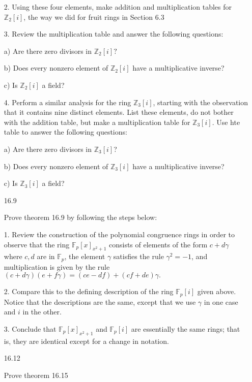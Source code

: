 \documentclass[12pt]{article}
\begin{document}
\begin{itemize}
2. Using these four elements, make addition and multiplication tables for $\mathbb{Z}_2[i]$, the way we did for fruit rings in Section 6.3

3. Review the multiplication table and answer the following questions:

a) Are there zero divisors in $\mathbb{Z}_2[i]?$

b) Does every nonzero element of $\mathbb{Z}_2[i]$ have a multiplicative inverse?

c) Is $\mathbb{Z}_2[i]$ a field?

4. Perform a similar analysis for the ring $\mathbb{Z}_3[i]$, starting with the observation that it contains nine distinct elements. List these elements, do not bother with the addition table, but make a multiplication table for $\mathbb{Z}_3[i]$. Use hte table to answer the following questions:

a) Are there zero divisors in $\mathbb{Z}_3[i]$?

b) Does every nonzero element of $\mathbb{Z}_3[i]$ have a multiplicative inverse?

c) Is $\mathbb{Z}_3[i]$ a field?

\newpage
\item[16.9]

Prove theorem 16.9 by following the steps below:

1. Review the construction of the polynomial congruence rings in order to observe that the ring $\mathbb{F}_p[x]_{x^2 + 1}$ consists of elements of the form $c+d\gamma$ where $c, d$ are in $\mathbb{F}_p$, the element $\gamma$ satisfies the rule $\gamma^2 = -1$, and multiplication is given by the rule $(c + d\gamma)(e + f\gamma) = (ce - df) + (cf + de)\gamma.$

2. Compare this to the defining description of the ring $\mathbb{F}_p[i]$ given above. Notice that the descriptions are the same, except that we use $\gamma$ in one case and $i$ in the other.

3. Conclude that $\mathbb{F}_p[x]_{x^2+1}$ and $\mathbb{F}_p[i]$ are essentially the same rings; that is, they are identical except for a change in notation.

\newpage
\item[16.12]

Prove theorem 16.15


\end{itemize}
\end{document}
